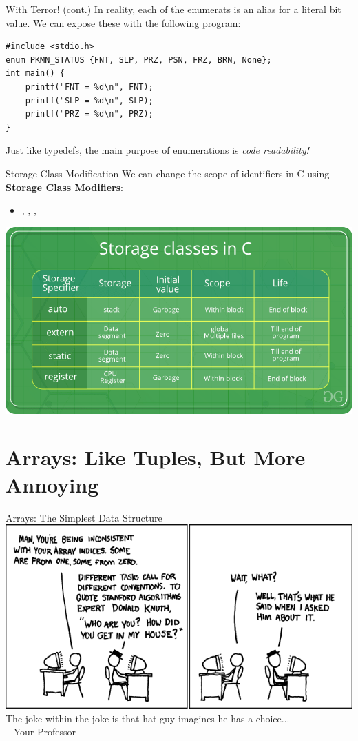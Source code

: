 \documentclass[11pt]{beamer}
\let\OldTexttt\texttt
\renewcommand{\texttt}[1]{\OldTexttt{\color{teal}{#1}}}
\begin{document}
\begin{frame}[fragile=singleslide]{\texttt{enum} With Terror! (cont.)}
In reality, each of the enumerats is an alias for a literal bit value.  We can expose these with the following program:
\begin{lstlisting}[style=C]
#include <stdio.h>
enum PKMN_STATUS {FNT, SLP, PRZ, PSN, FRZ, BRN, None}; 
int main() {
	printf("FNT = %d\n", FNT);
	printf("SLP = %d\n", SLP);
	printf("PRZ = %d\n", PRZ);
}
\end{lstlisting}
Just like typedefs, the main purpose of enumerations is \emph{code readability!} 
\end{frame}

\begin{frame}{Storage Class Modification}
We can change the scope of identifiers in C using \textbf{Storage Class Modifiers}:
\begin{itemize} 
\item \texttt{auto}, \texttt{register}, \texttt{extern}, \texttt{static}
\end{itemize}
\center
\includegraphics[scale=0.3]{Storage-Classes-In-C.png}
\end{frame}

\section[Arrays]{Arrays: Like Tuples, But More Annoying} %
\begin{frame}{Arrays: The Simplest Data Structure}
\center
\includegraphics[scale=3]{donald_knuth.png} \\
The joke within the joke is that hat guy imagines he has a choice... \\ 
-- Your Professor -- 
\end{frame}
\end{document}
